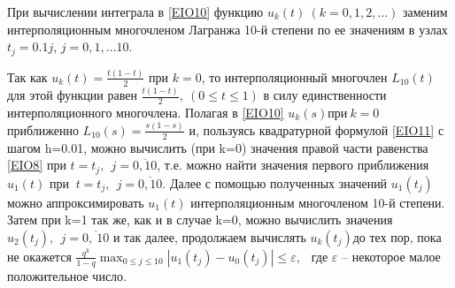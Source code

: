 При вычислении интеграла в \eqref{EIO10} функцию $u_k\left(t\right)\ (k=0,1,2,\dots )$ заменим интерполяционным многочленом Лагранжа 10-й степени по ее значениям в узлах $t_j=0.1j$, $j=0,1,\dots 10.$

Так как $u_k\left(t\right)=\frac{t(1-t)}{2}$  при $k=0$, то интерполяционный многочлен $L_{10}(t)$ для этой функции равен $\frac{t(1-t)}{2},\ (0\le t\le 1)$ в силу единственности интерполяционного многочлена. Полагая  в \eqref{EIO10} $u_k\left(s\right)при\ k=0$ приближенно $L_{10}\left(s\right)=\frac{s(1-s)}{2}$ и, пользуясь квадратурной формулой \eqref{EIO11} с шагом h=0.01, можно вычислить (при k=0) значения правой части равенства \eqref{EIO8} при $t=t_j,\ \ j=\overline{0,10}$, т.е. можно найти значения первого приближения $u_1(t)$ при $\ t=t_j,\ \ j=\overline{0,10}$.  Далее с помощью полученных значений $u_1(t_j)$ можно аппроксимировать $u_1(t)$  интерполяционным многочленом 10-й степени. Затем при k=1 так же, как и в случае k=0, можно вычислить значения  $u_2\left(t_j\right),\ \ j=\overline{0,\ 10}$ и так далее, продолжаем вычислять $u_k\left(t_j\right)$до тех пор, пока не окажется  $\frac{q^k}{1-q}{\mathop{\max }_{0\le j\le 10} \left|u_1\left(t_j\right)-u_0\left(t_j\right)\right|\le \varepsilon ,\ \ }$ где $\varepsilon $ -- некоторое малое положительное число.

